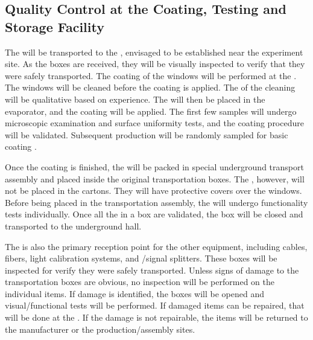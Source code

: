 \subsection{Quality Control at the Coating, Testing and Storage Facility}

The  will be transported to the , envisaged to be established %
near the experiment site. As the  boxes are received, they will be visually inspected to verify that they were safely transported. The  coating of the  windows will be performed at the . The  windows will be cleaned before the coating is applied. The  of the cleaning will be qualitative based on experience. The  will then be placed in the evaporator, and the coating will be applied. The first few samples will undergo microscopic examination and surface uniformity tests, and the coating procedure will be validated. Subsequent production  will be randomly sampled for basic coating .

Once the coating is finished, the  will be packed in special underground transport assembly and placed inside the original transportation boxes. The , however, will not be placed in the cartons. They will have protective covers over the windows. Before being placed in the transportation assembly, the  will undergo functionality tests individually. Once all the  in a box are validated, the box will be closed and transported to the underground hall.

The  is also the primary reception point for the other   equipment, including cables, fibers, light calibration systems, and /signal splitters. These boxes will be inspected for verify they were safely transported. Unless signs of  damage to the transportation boxes are obvious, no  inspection will be performed on the individual items. If  damage is identified, the boxes will be opened and visual/functional  tests will be performed. If damaged items can be repaired, that will be done at the . If the damage is not repairable, the items will be returned to the manufacturer or the production/assembly sites.

